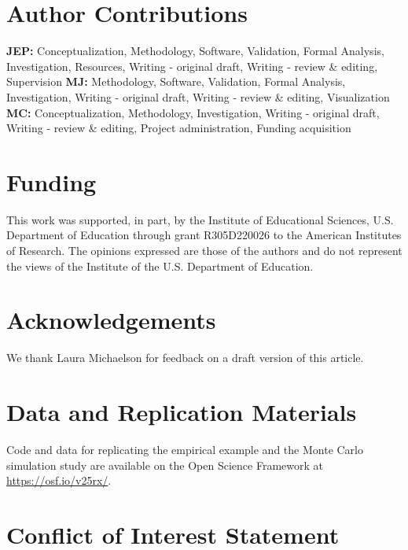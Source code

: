 \documentclass[
  american,
  man, donotrepeattitle,floatsintext]{apa7}
\begin{document}
\section*{Author Contributions}\label{author-contributions}

\textbf{JEP:} Conceptualization, Methodology, Software, Validation, Formal Analysis, Investigation, Resources, Writing - original draft, Writing - review \& editing, Supervision \textbf{MJ:} Methodology, Software, Validation, Formal Analysis, Investigation, Writing - original draft, Writing - review \& editing, Visualization \textbf{MC:} Conceptualization, Methodology, Investigation, Writing - original draft, Writing - review \& editing, Project administration, Funding acquisition

\section*{Funding}\label{funding}

This work was supported, in part, by the Institute of Educational Sciences, U.S. Department of Education through grant R305D220026 to the American Institutes of Research.
The opinions expressed are those of the authors and do not represent the views of the Institute of the U.S. Department of Education.

\section*{Acknowledgements}\label{acknowledgements}

We thank Laura Michaelson for feedback on a draft version of this article.

\section*{Data and Replication Materials}\label{data-and-replication-materials}

Code and data for replicating the empirical example and the Monte Carlo simulation study are available on the Open Science Framework at \url{https://osf.io/v25rx/}.

\section*{Conflict of Interest Statement}\label{conflict-of-interest-statement}
\end{document}
